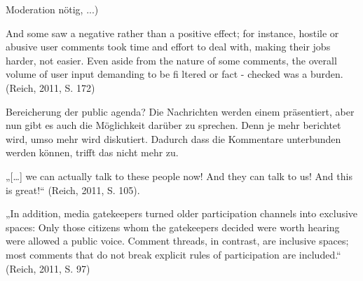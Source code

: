 \documentclass[12pt,parskip=full,ngerman,draft]{scrreprt} %
\begin{document}
Moderation nötig, ...)


And some saw a negative rather than a positive effect; for instance, hostile or
abusive user comments took time and effort to deal with, making their jobs
harder, not easier. Even aside from the nature of some comments, the overall
volume of user input demanding to be fi ltered or fact - checked was a burden.
(Reich, 2011, S. 172)




Bereicherung der public agenda? Die Nachrichten werden einem präsentiert, aber
nun gibt es auch die Möglichkeit darüber zu sprechen. Denn je mehr berichtet
wird, umso mehr wird diskutiert. Dadurch dass die Kommentare unterbunden werden
können, trifft das nicht mehr zu.

 

„[\ldots] we can actually talk to these people now! And they can talk to us! And
this is great!“ (Reich, 2011, S. 105).

„In addition, media gatekeepers  turned older participation channels into
exclusive spaces: Only those citizens whom the gatekeepers decided were
worth hearing were allowed a public voice. Comment threads, in contrast,
are inclusive spaces; most comments that do not break explicit rules of
participation are included.“ (Reich, 2011, S. 97)

\printbibliography
\end{document}
